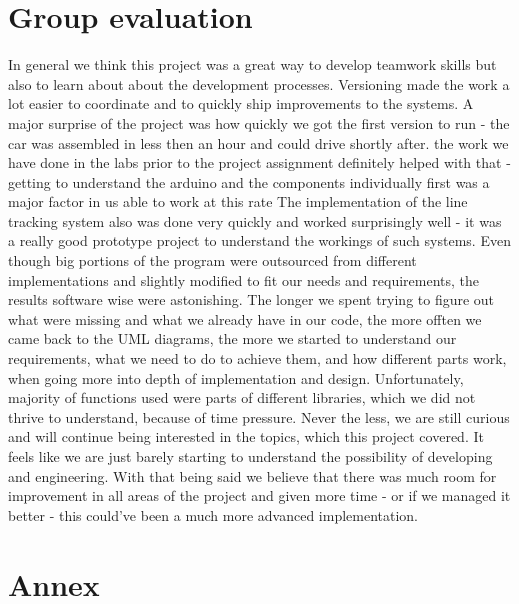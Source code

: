 \documentclass[conference]{IEEEtran}
\begin{document}
\section{Group evaluation}
In general we think this project was a great way to develop teamwork skills but also to learn about about the development processes. Versioning made the work a lot easier to coordinate and to quickly ship improvements to the systems. A major surprise of the project was how quickly we got the first version to run - the car was assembled in less then an hour and could drive shortly after. the work we have done in the labs prior to the project assignment definitely helped with that - getting to understand the arduino and the components individually first was a major factor in us able to work at this rate The implementation of the line tracking system also was done very quickly and worked surprisingly well - it was a really good prototype project to understand the workings of such systems. Even though big portions of the program were outsourced from different implementations and slightly modified to fit our needs and requirements, the results software wise were astonishing. The longer we spent trying to figure out what were missing and what we already have in our code, the more offten we came back to the UML diagrams, the more we started to understand our requirements, what we need to do to achieve them, and how different parts work, when going more into depth of implementation and design. Unfortunately, majority of functions used were parts of different libraries, which we did not thrive to understand, because of time pressure. Never the less, we are still curious and will continue being interested in the topics, which this project covered. It feels like we are just barely starting to understand the possibility of developing and engineering. With that being said we believe that there was much room for improvement in all areas of the project and given more time - or if we managed it better - this could've been a much more advanced implementation.

\section{Annex}
\end{document}
